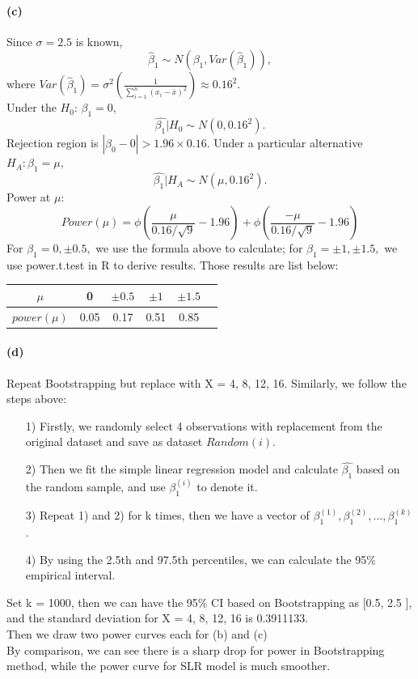 \documentclass{article}
\begin{document}
\paragraph{(c)}
Since $\sigma=2.5$ is known, 
$$\hat{\beta}_1\sim N(\beta_1,Var(\hat{\beta}_1)),$$
where $Var(\hat{\beta}_1)=\sigma^2(\frac{1}{\sum_{i=1}^{n}(x_i-\bar{x})^2})\approx 0.16^2.$\\
Under the $H_0$: $\beta_1=0$,
$$\hat{\beta_1}|H_0\sim N(0,0.16^2).$$
Rejection region is $|\hat{\beta}_0-0|>1.96\times 0.16.$
Under a particular alternative $H_A:\beta_1=\mu,$
$$\hat{\beta_1}|H_A\sim N(\mu,0.16^2).$$
Power at $\mu$:
$$Power(\mu)=\phi (\frac{\mu}{0.16/\sqrt{9}}-1.96)+\phi (\frac{-\mu}{0.16/\sqrt{9}}-1.96)$$
For $\beta_1=0,\pm 0.5,$ we use the formula above to calculate; for $\beta_1=\pm 1,\pm 1.5,$ we use power.t.test in R to derive results.
Those results are list below:
\begin{table}[]
	\centering
	\begin{tabular}{cccccc}\hline
		$\mu$ & 0 & $\pm 0.5$ & $\pm 1$ & $\pm 1.5$\\ \hline
		$power(\mu)$ & 0.05 & 0.17 & 0.51 & 0.85 \\ \hline
	\end{tabular}
\end{table}

\paragraph{(d)}
 Repeat Bootstrapping but replace with X = 4, 8, 12, 16. Similarly, we follow the steps above:
\begin{itemize}
	\item[1)]
	Firstly, we randomly select 4 observations with replacement from the original dataset and save as dataset $Random(i)$.
	\item[2)]
	Then we fit the simple linear regression model and calculate $\hat{\beta_1}$ based on the random sample, and use $\beta_1^{(i)}$ to denote it.
	\item[3)]
	Repeat 1) and 2) for k times, then we have a vector of $\beta_1^{(1)}, \beta_1^{(2)},...,\beta_1^{(k)}$.
	\item[4)]
	By using the 2.5th and 97.5th percentiles, we can calculate the 95\% empirical interval.
\end{itemize}
Set k = 1000, then we can have the 95\% CI based on Bootstrapping as [0.5, 2.5 ], and the standard deviation for X = 4, 8, 12, 16 is 0.3911133.\\
Then we draw two power curves each for (b) and (c)\\
By comparison, we can see there is a sharp drop for power in Bootstrapping method, while the power curve for SLR model is much smoother.
\end{document}
